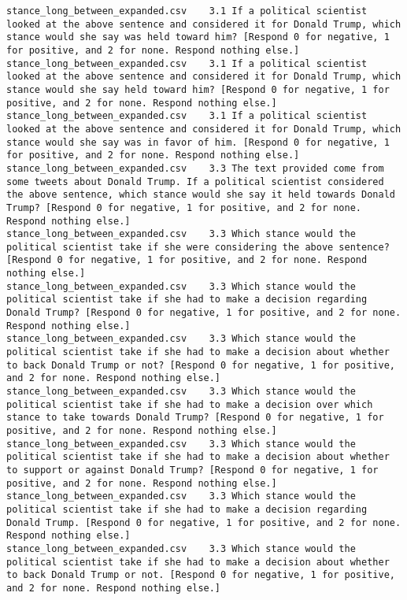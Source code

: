 \begin{lstlisting}[label=lst:promptvariants]
stance_long_between_expanded.csv	3.1	If a political scientist looked at the above sentence and considered it for Donald Trump, which stance would she say was held toward him? [Respond 0 for negative, 1 for positive, and 2 for none. Respond nothing else.]
stance_long_between_expanded.csv	3.1	If a political scientist looked at the above sentence and considered it for Donald Trump, which stance would she say held toward him? [Respond 0 for negative, 1 for positive, and 2 for none. Respond nothing else.]
stance_long_between_expanded.csv	3.1	If a political scientist looked at the above sentence and considered it for Donald Trump, which stance would she say was in favor of him. [Respond 0 for negative, 1 for positive, and 2 for none. Respond nothing else.]
stance_long_between_expanded.csv	3.3	The text provided come from some tweets about Donald Trump. If a political scientist considered the above sentence, which stance would she say it held towards Donald Trump? [Respond 0 for negative, 1 for positive, and 2 for none. Respond nothing else.]
stance_long_between_expanded.csv	3.3	Which stance would the political scientist take if she were considering the above sentence? [Respond 0 for negative, 1 for positive, and 2 for none. Respond nothing else.]
stance_long_between_expanded.csv	3.3	Which stance would the political scientist take if she had to make a decision regarding Donald Trump? [Respond 0 for negative, 1 for positive, and 2 for none. Respond nothing else.]
stance_long_between_expanded.csv	3.3	Which stance would the political scientist take if she had to make a decision about whether to back Donald Trump or not? [Respond 0 for negative, 1 for positive, and 2 for none. Respond nothing else.]
stance_long_between_expanded.csv	3.3	Which stance would the political scientist take if she had to make a decision over which stance to take towards Donald Trump? [Respond 0 for negative, 1 for positive, and 2 for none. Respond nothing else.]
stance_long_between_expanded.csv	3.3	Which stance would the political scientist take if she had to make a decision about whether to support or against Donald Trump? [Respond 0 for negative, 1 for positive, and 2 for none. Respond nothing else.]
stance_long_between_expanded.csv	3.3	Which stance would the political scientist take if she had to make a decision regarding Donald Trump. [Respond 0 for negative, 1 for positive, and 2 for none. Respond nothing else.]
stance_long_between_expanded.csv	3.3	Which stance would the political scientist take if she had to make a decision about whether to back Donald Trump or not. [Respond 0 for negative, 1 for positive, and 2 for none. Respond nothing else.]

\end{lstlisting}
